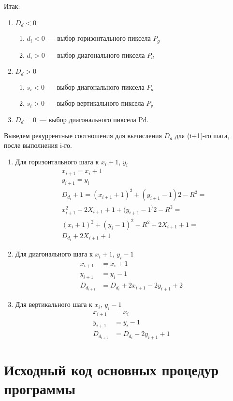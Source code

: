 Итак:
\begin{enumerate}
\item $D_d < 0$
	\begin{enumerate}
	\item $d_i < 0$~--- выбор горизонтального пиксела $P_g$
	\item $d_i > 0$~--- выбор диагонального пиксела $P_d$
	\end{enumerate}
\item $D_d > 0$
	\begin{enumerate}
	\item $s_i < 0$~--- выбор диагонального пиксела $P_d$
	\item $s_i > 0$~--- выбор вертикального пиксела $P_v$
	\end{enumerate}
\item $D_d = 0$~--- выбор диагонального пиксела Pd.
\end{enumerate}
Выведем рекуррентные соотношения для вычисления $D_d$ для (i+1)-го шага, после выполнения i-го.
\begin{enumerate}
\item Для горизонтального шага к $x_i+1$, $y_i$
\begin{align*}
&x_{i+1} = x_i + 1 \\
&y_{i+1} = y_i \\
&D_{d_i}+1 = (x_{i+1}+1)^2 + (y_{i+1}-1)2 - R^2 = \\ 
&x_{i+1}^2 + 2X_{i+1} + 1 + (y_{i+1}-1^)2 - R^2 = \\
&(x_i+1)^2 + (y_i-1)^2 - R^2 + 2X_{i+1} + 1 = \\
&D_{d_i} + 2X_{i+1} + 1
\end{align*}
\item Для диагонального шага к $x_i+1$, $y_i-1$
\begin{align*}
x_{i+1} &= x_i + 1 \\
y_{i+1} &= y_i - 1 \\
D_{d_{i+1}} &= D_{d_i} + 2x_{i+1} - 2y_{i+1} + 2
\end{align*}
\item Для вертикального шага к $x_i$, $y_i-1$
\begin{align*}
x_{i+1}& = x_i \\
y_{i+1} &= y_i - 1 \\
D_{d_{i+1}} &= D_{d_i} - 2y_{i+1} + 1
\end{align*}
\end{enumerate}
\newpage
\section{Исходный код основных процедур программы}
